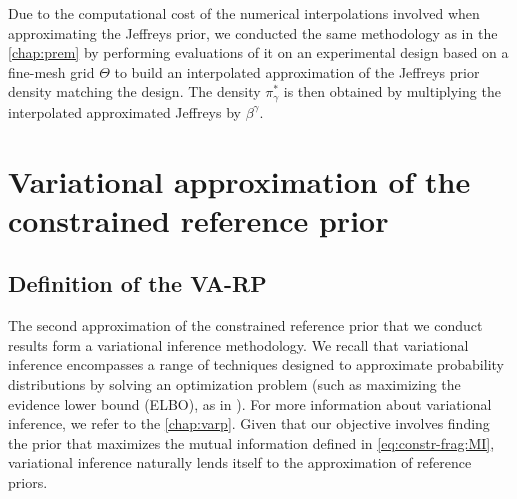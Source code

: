Due to the computational cost of the numerical interpolations involved when approximating the Jeffreys prior, we conducted the same methodology as in the \cref{chap:prem} by performing  evaluations of it on an experimental design based on a fine-mesh grid $\Theta$ to build an interpolated approximation of the Jeffreys prior density matching the design.
The density $\pi^\ast_\gamma$ is then obtained by multiplying the interpolated approximated Jeffreys by $\beta^\gamma$.

\begin{figure}[h]
    \centering
    
    \label{fig:constr-frags:PGA}
\end{figure}


\section{Variational approximation of the constrained reference prior}


\subsection{Definition of the VA-RP}

The second approximation of the constrained reference prior that we conduct results form a variational inference methodology.
We recall that
variational inference encompasses a range of techniques designed to approximate probability distributions by solving an optimization problem (such as maximizing the evidence lower bound (ELBO), as in \cite{kingma_auto-encoding_2014}). 
For more information about variational inference, we refer to the \cref{chap:varp}.
Given that our objective involves finding the prior that maximizes the mutual information defined in \cref{eq:constr-frag:MI}, variational inference naturally lends itself to the approximation of reference priors.  


